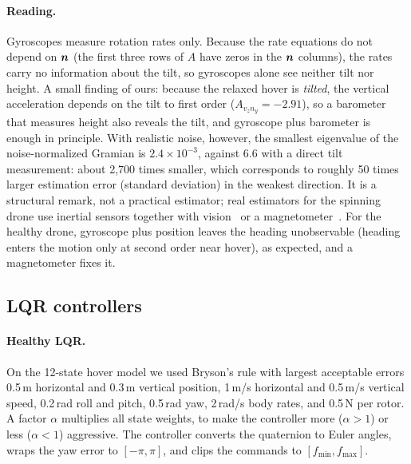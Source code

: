 \paragraph{Reading.} Gyroscopes measure rotation rates only. Because the rate equations do not depend on $\boldsymbol{n}$ (the first three rows of $A$ have zeros in the $\boldsymbol{n}$ columns), the rates carry no information about the tilt, so gyroscopes alone see neither tilt nor height. A small finding of ours: because the relaxed hover is \emph{tilted}, the vertical acceleration depends on the tilt to first order ($A_{v_z n_y} = -2.91$), so a barometer that measures height also reveals the tilt, and gyroscope plus barometer is enough in principle. With realistic noise, however, the smallest eigenvalue of the noise-normalized Gramian is $2.4\times10^{-3}$, against 6.6 with a direct tilt measurement: about 2,700 times smaller, which corresponds to roughly 50 times larger estimation error (standard deviation) in the weakest direction. It is a structural remark, not a practical estimator; real estimators for the spinning drone use inertial sensors together with vision~\cite{sun2021vision} or a magnetometer~\cite{solanki2022attitude}. For the healthy drone, gyroscope plus position leaves the heading unobservable (heading enters the motion only at second order near hover), as expected, and a magnetometer fixes it.

\subsection{LQR controllers}
\paragraph{Healthy LQR.} On the 12-state hover model we used Bryson's rule with largest acceptable errors 0.5\,m horizontal and 0.3\,m vertical position, 1\,m/s horizontal and 0.5\,m/s vertical speed, 0.2\,rad roll and pitch, 0.5\,rad yaw, 2\,rad/s body rates, and 0.5\,N per rotor. A factor $\alpha$ multiplies all state weights, to make the controller more ($\alpha>1$) or less ($\alpha<1$) aggressive. The controller converts the quaternion to Euler angles, wraps the yaw error to $[-\pi,\pi]$, and clips the commands to $[f_{\min}, f_{\max}]$.

